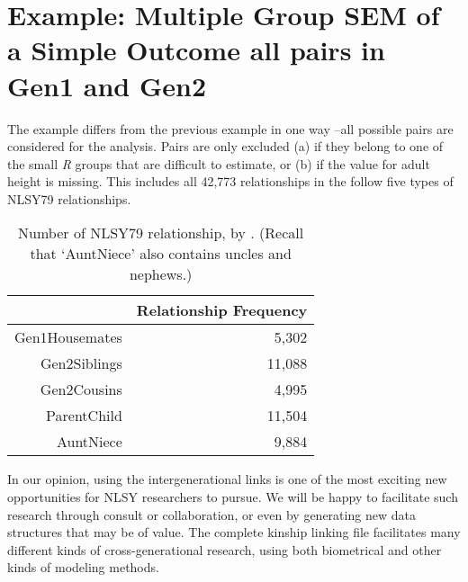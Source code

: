 \documentclass{article}\usepackage[]{graphicx}\usepackage[]{color}
\begin{document}
\section{Example: Multiple Group SEM of a Simple Outcome all pairs in Gen1 and Gen2}
The example differs from the previous example in one way --all possible pairs are considered for the analysis.  Pairs are only excluded  (a) if they belong to one of the small \emph{R} groups that are difficult to estimate, or (b) if the value for adult height is missing.  This includes all 42,773 relationships in the follow five types of NLSY79 relationships.  
\begin{table}[ht]
\centering
\begin{tabular}{rr}
  \hline
 & Relationship Frequency \\ 
  \hline
Gen1Housemates & 5,302 \\ 
  Gen2Siblings & 11,088 \\ 
  Gen2Cousins & 4,995 \\ 
  ParentChild & 11,504 \\ 
  AuntNiece & 9,884 \\ 
   \hline
\end{tabular}
\caption{Number of NLSY79 relationship, by .  (Recall that `AuntNiece' also contains uncles and nephews.)} 
\end{table}



In our opinion, using the intergenerational links is one of the most exciting new opportunities for NLSY researchers to pursue.  We will be happy to facilitate such research through consult or collaboration, or even by generating new data structures that may be of value.  The complete kinship linking file facilitates many different kinds of cross-generational research, using both biometrical and other kinds of modeling methods.
\end{document}
